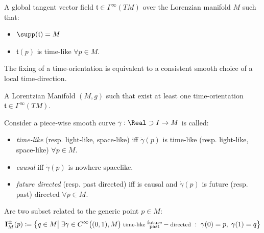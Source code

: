 \documentclass[Main]{subfiles}
\begin{document}
	\begin{definition}
		A global tangent vector field  $\mathfrak{t}\in \Gamma^\infty(TM)$ over the Lorenzian manifold $M$ such that:
		\begin{itemize}
			\item $\supp(\mathfrak{t}) = M$
			\item $\mathfrak{t}(p)$ is time-like $\forall p \in M$.
		\end{itemize}
	\end{definition}
	\begin{observation}
		The fixing of a time-orientation is equivalent to a consistent smooth choice of a local time-direction.
	\end{observation}	
	
	\begin{definition}
		A Lorentzian Manifold $(M,g)$ such that exist at least one time-orientation $\mathfrak{t}\in \Gamma^\infty(TM)$.
	\end{definition}

	\begin{notationfix}
		Consider a piece-wise smooth curve $\gamma: \Real\supset I \rightarrow M$ is called:
		\begin{itemize}
			\item \emph{time-like} (resp. light-like, space-like) iff $\dot{\gamma}(p)$ is time-like (resp. light-like, space-like) $\forall p \in M$.
			\item \emph{causal} iff $\dot{\gamma}(p)$ is nowhere spacelike.
			\item \emph{future directed} (resp. past directed) iff is causal and  $\dot{\gamma}(p)$ is future (resp. past) directed $\forall p \in M$.
		\end{itemize}
	\end{notationfix}

	\begin{definition}
		Are two subset related to the generic point $p	\in M$:
		\begin{displaymath}
			\mathbf{I}_M^\pm(p) \coloneqq \big\{ q \in M \big\vert \; \exists \gamma \in C^\infty\big((0,1), M\big)\;  \textrm{\footnotesize time-like } \substack{\textrm{future}\\ \textrm{past} } -\textrm{\footnotesize directed }:\; \gamma(0)=p,\; \gamma(1)=q  \big\}
		\end{displaymath}
	\end{definition}
	
\end{document}
